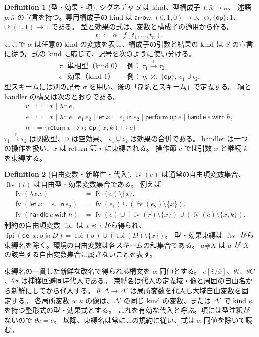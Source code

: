 \documentclass[a4paper,11pt]{article}
\theoremstyle{definition}
\newtheorem{definition}{Definition}[section]
\newcommand{\FV}{\operatorname{fv}}
\newcommand{\FTV}{\operatorname{ftv}}
\newcommand{\FPI}{\operatorname{fpi}}
\newcommand{\op}{\mathsf{op}}
\newcommand{\emp}{\varnothing}
\newcommand{\arr}[3]{#1\xrightarrow{#2}#3}
\newcommand{\inst}[2]{#1\preccurlyeq #2}
\newcommand{\Def}[3]{\mathsf{def}\ #1:#2\ \mathsf{in}\ #3}
\newcommand{\lete}[3]{\mathsf{let}\ #1=#2\ \mathsf{in}\ #3}
\newcommand{\perform}[2]{\mathsf{perform}\ #1\ #2}
\newcommand{\handle}[2]{\mathsf{handle}\ #1\ \mathsf{with}\ #2}
\begin{document}
\begin{definition}[型・効果・項]
シグネチャ $S$ は kind、型構成子 $f:\bar\kappa\to\kappa$、
述語 $p:\bar\kappa$ の宣言を持つ。専用構成子の kind は
$\mathsf{arrow}:(0,1,0)\to0$、$\emp,\{\op\}:1$、$\cup:(1,1)\to1$ である。
型と効果の式は、変数と構成子の適用から作る。
\[
 t::=\alpha\mid f(t_1,\ldots,t_n).
\]
ここで $\alpha$ は任意の kind の変数を表し、構成子の引数と結果の kind は
$S$ の宣言に従う。式の kind に応じて、記号を次のように使い分ける。
\[
\begin{array}{lll}
 \tau & \text{単相型（kind $0$）} & \text{例：}\ \arr{\tau_1}{\epsilon}{\tau_2},\\
 \epsilon & \text{効果（kind $1$）} & \text{例：}\ \eta,\ \emp,\ \{\op\},\ \epsilon_1\cup\epsilon_2.
\end{array}
\]
型スキームには別の記号 $\sigma$ を用い、後の「制約とスキーム」で定義する。
項と handler の構文は次のとおりである。
\begin{align*}
 v&::=x\mid\lambda x.e,\\
 e&::=x\mid\lambda x.e\mid e_1\,e_2\mid\lete{x}{e_1}{e_2}
       \mid\perform{\op}{e}\mid\handle{e}{h},\\
 h&=\{\mathsf{return}\ x\mapsto r;\ \op(x,k)\mapsto c\}.
\end{align*}
$\arr{\tau_1}{\epsilon}{\tau_2}$ は関数型、$\emp$ は空効果、
$\epsilon_1\cup\epsilon_2$ は効果の合併である。
handler は一つの操作を扱い、$x$ は return 節 $r$ に束縛される。
操作節 $c$ では引数 $x$ と継続 $k$ を束縛する。
\end{definition}

\begin{definition}[自由変数・新鮮性・代入]
$\FV(e)$ は通常の自由項変数集合、$\FTV(t)$ は自由型・効果変数集合である。
例えば
\begin{align*}
\FV(\lambda x.e)&=\FV(e)\setminus\{x\},\\
\FV(\lete{x}{e_1}{e_2})&=\FV(e_1)\cup(\FV(e_2)\setminus\{x\}),\\
\FV(\handle e h)&=\FV(e)\cup(\FV(r)\setminus\{x\})
                         \cup(\FV(c)\setminus\{x,k\}).
\end{align*}
制約の自由項変数 $\FPI$ は $\inst{x}{\tau}$ から得られ、
$\FPI(\Def{x}{\sigma}{D})=\FPI(\sigma)\cup(\FPI(D)\setminus\{x\})$。
型・効果束縛は $\FTV$ から束縛名を除く。環境の自由変数は各スキームの和集合である。
$a\#X$ は $a$ が $X$ の該当する自由変数集合に属さないことを表す。

束縛名の一貫した新鮮な改名で得られる構文を $\alpha$ 同値とする。
$e[\bar v/\bar x]$、$\theta t$、$\theta C$、$\theta\sigma$ は捕獲回避同時代入である。
束縛名は代入の定義域・像と周囲の自由名から新鮮にしてから代入する。
$\theta:\Delta\to\Delta'$ は局所変数を代入し大域自由変数を固定する。
各局所変数 $\alpha:\kappa$ の像は、$\Delta'$ の同じ kind の変数、または
$\Delta'$ で kind $\kappa$ を持つ整形式の型・効果式とする。
これを有効な代入と呼ぶ。項には型注釈がないので $\theta e=e$。
以降、束縛名は常にこの規約に従い、式は $\alpha$ 同値を除いて読む。
\end{definition}
\end{document}
